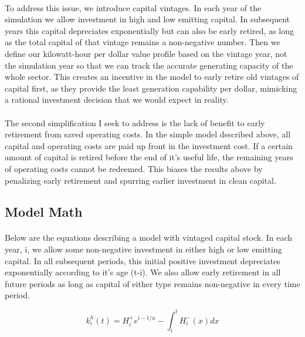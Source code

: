\documentclass{article}
\begin{document}
\paragraph{} To address this issue, we introduce capital vintages. In each year of the simulation we allow investment in high and low emitting capital. In subsequent years this capital depreciates exponentially but can also be early retired, as long as the total capital of that vintage remains a non-negative number. Then we define our kilowatt-hour per dollar value profile based on the vintage year, not the simulation year so that we can track the accurate generating capacity of the whole sector. This creates an incentive in the model to early retire old vintages of capital first, as they provide the least generation capability per dollar, mimicking a rational investment decision that we would expect in reality. 

\paragraph{} The second simplification I seek to address is the lack of benefit to early retirement from saved operating costs. In the simple model described above, all capital and operating costs are paid up front in the investment cost. If a certain amount of capital is retired before the end of it's useful life, the remaining years of operating costs cannot be redeemed. This biases the results above by penalizing early retirement and spurring earlier investment in clean capital. 


\subsection{Model Math}

\paragraph{} Below are the equations describing a model with vintaged capital stock. In each year, i, we allow some non-negative investment in either high or low emitting capital. In all subsequent periods, this initial positive investment depreciates exponentially according to it's age (t-i). We also allow early retirement in all future periods as long as capital of either type remains non-negative in every time period. 

\begin{equation}
k_i^h(t) = H_i^+ e^{i-t/n} - \int_i^t H^-_i(x)dx
\end{equation}
\end{document}
